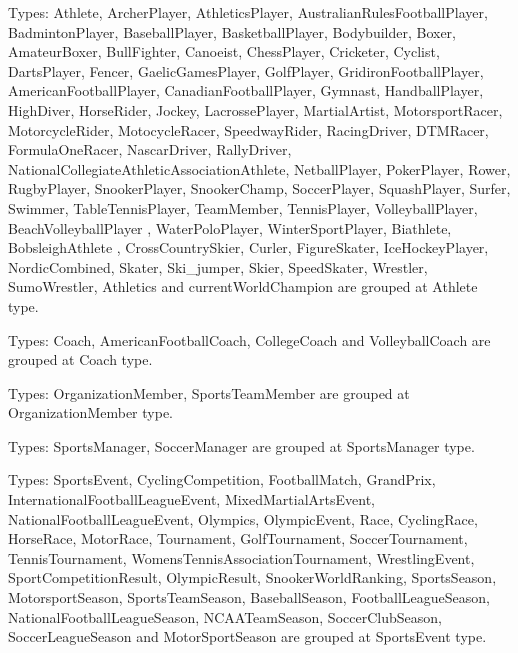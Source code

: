 \documentclass[thesis=M,english]{FITthesis}[2018/05/30]
\begin{document}
Types: Athlete, ArcherPlayer, AthleticsPlayer, AustralianRulesFootballPlayer, BadmintonPlayer, BaseballPlayer, BasketballPlayer, Bodybuilder, Boxer, AmateurBoxer, BullFighter, Canoeist, ChessPlayer, Cricketer, Cyclist, DartsPlayer, Fencer, GaelicGamesPlayer, GolfPlayer, GridironFootballPlayer, AmericanFootballPlayer, CanadianFootballPlayer, Gymnast, HandballPlayer, HighDiver, HorseRider, Jockey, LacrossePlayer, MartialArtist, MotorsportRacer, MotorcycleRider, MotocycleRacer, SpeedwayRider, RacingDriver, DTMRacer, FormulaOneRacer, NascarDriver, RallyDriver, NationalCollegiateAthleticAssociationAthlete, NetballPlayer, PokerPlayer, Rower, RugbyPlayer, SnookerPlayer, SnookerChamp, SoccerPlayer, SquashPlayer, Surfer, Swimmer, TableTennisPlayer, TeamMember, TennisPlayer, VolleyballPlayer, BeachVolleyballPlayer , WaterPoloPlayer, WinterSportPlayer, Biathlete, BobsleighAthlete , CrossCountrySkier, Curler, FigureSkater, IceHockeyPlayer, NordicCombined, Skater, Ski\_jumper, Skier, SpeedSkater, Wrestler, SumoWrestler, Athletics and currentWorldChampion are grouped at Athlete type.

Types: Coach, AmericanFootballCoach, CollegeCoach and VolleyballCoach are grouped at Coach type.

Types: OrganizationMember, SportsTeamMember are grouped at OrganizationMember type.

Types: SportsManager, SoccerManager are grouped at SportsManager type.

Types: SportsEvent, CyclingCompetition, FootballMatch, GrandPrix, InternationalFootballLeagueEvent, MixedMartialArtsEvent, NationalFootballLeagueEvent, Olympics, OlympicEvent, Race, CyclingRace, HorseRace, MotorRace, Tournament, GolfTournament, SoccerTournament, TennisTournament, WomensTennisAssociationTournament, WrestlingEvent, SportCompetitionResult, OlympicResult, SnookerWorldRanking, SportsSeason, MotorsportSeason, SportsTeamSeason, BaseballSeason, FootballLeagueSeason, NationalFootballLeagueSeason, NCAATeamSeason, SoccerClubSeason, SoccerLeagueSeason and MotorSportSeason are grouped at SportsEvent type. 
\end{document}
